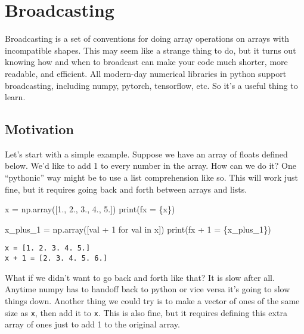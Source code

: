 \documentclass[
  letterpaper,
  DIV=11,
  numbers=noendperiod]{scrreprt}
\newenvironment{Shaded}{\begin{snugshade}}{\end{snugshade}}
\newcommand{\BuiltInTok}[1]{\textcolor[rgb]{0.00,0.23,0.31}{#1}}
\newcommand{\ControlFlowTok}[1]{\textcolor[rgb]{0.00,0.23,0.31}{#1}}
\newcommand{\DecValTok}[1]{\textcolor[rgb]{0.68,0.00,0.00}{#1}}
\newcommand{\FloatTok}[1]{\textcolor[rgb]{0.68,0.00,0.00}{#1}}
\newcommand{\KeywordTok}[1]{\textcolor[rgb]{0.00,0.23,0.31}{#1}}
\newcommand{\NormalTok}[1]{\textcolor[rgb]{0.00,0.23,0.31}{#1}}
\newcommand{\OperatorTok}[1]{\textcolor[rgb]{0.37,0.37,0.37}{#1}}
\newcommand{\SpecialCharTok}[1]{\textcolor[rgb]{0.37,0.37,0.37}{#1}}
\newcommand{\SpecialStringTok}[1]{\textcolor[rgb]{0.13,0.47,0.30}{#1}}
\begin{document}
\hypertarget{broadcasting}{%
\section{Broadcasting}\label{broadcasting}}

Broadcasting is a set of conventions for doing array operations on
arrays with incompatible shapes. This may seem like a strange thing to
do, but it turns out knowing how and when to broadcast can make your
code much shorter, more readable, and efficient. All modern-day
numerical libraries in python support broadcasting, including numpy,
pytorch, tensorflow, etc. So it's a useful thing to learn.

\hypertarget{motivation}{%
\subsection{Motivation}\label{motivation}}

Let's start with a simple example. Suppose we have an array of floats
defined below. We'd like to add 1 to every number in the array. How can
we do it? One ``pythonic'' way might be to use a list comprehension like
so. This will work just fine, but it requires going back and forth
between arrays and lists.

\begin{Shaded}
\begin{Highlighting}[]
\NormalTok{x }\OperatorTok{=}\NormalTok{ np.array([}\FloatTok{1.}\NormalTok{, }\FloatTok{2.}\NormalTok{, }\FloatTok{3.}\NormalTok{, }\FloatTok{4.}\NormalTok{, }\FloatTok{5.}\NormalTok{])}
\BuiltInTok{print}\NormalTok{(}\SpecialStringTok{f\textquotesingle{}x = }\SpecialCharTok{\{}\NormalTok{x}\SpecialCharTok{\}}\SpecialStringTok{\textquotesingle{}}\NormalTok{)}

\NormalTok{x\_plus\_1 }\OperatorTok{=}\NormalTok{ np.array([val }\OperatorTok{+} \DecValTok{1} \ControlFlowTok{for}\NormalTok{ val }\KeywordTok{in}\NormalTok{ x])}
\BuiltInTok{print}\NormalTok{(}\SpecialStringTok{f\textquotesingle{}x + 1 = }\SpecialCharTok{\{}\NormalTok{x\_plus\_1}\SpecialCharTok{\}}\SpecialStringTok{\textquotesingle{}}\NormalTok{)}
\end{Highlighting}
\end{Shaded}

\begin{verbatim}
x = [1. 2. 3. 4. 5.]
x + 1 = [2. 3. 4. 5. 6.]
\end{verbatim}

What if we didn't want to go back and forth like that? It is slow after
all. Anytime numpy has to handoff back to python or vice versa it's
going to slow things down. Another thing we could try is to make a
vector of ones of the same size as \texttt{x}, then add it to
\texttt{x}. This is also fine, but it requires defining this extra array
of ones just to add 1 to the original array.
\end{document}
